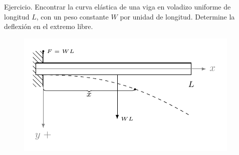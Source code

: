 \documentclass{beamer}
\begin{document}
\begin{frame}[t]
	\begin{alertblock}{Ejercicio.}
		Encontrar la curva elástica de una viga en voladizo uniforme de longitud \(L\), con un peso constante \(W\) por unidad de longitud. Determine la deflexión en el extremo libre.
	\end{alertblock}
	\begin{figure}[ht]
		\centering
		\includegraphics[width= \linewidth]{IMAGENES_VIGAS/6/tikz.pdf}
	\end{figure}
\end{frame}
\end{document}
